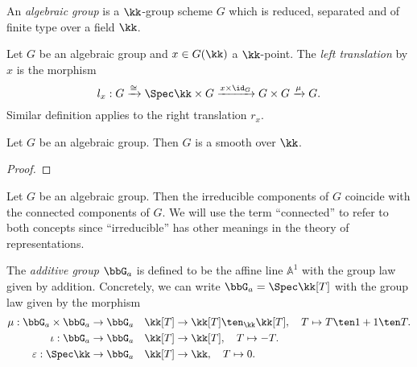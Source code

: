     \begin{definition}\label{def:algebraic_group}
        An \emph{algebraic group} is a \(\kk\)-group scheme \(G\) which is reduced, separated and of finite type over a field \(\kk\).
    \end{definition}

    \begin{definition}\label{def:transition_morphism}
        Let \(G\) be an algebraic group and \(x \in G(\kk)\) a \(\kk\)-point.
        The \emph{left translation} by \(x\) is the morphism
        \[
            l_x: G \xrightarrow{\cong} \Spec \kk \times G \xrightarrow{x \times \id_G} G \times G \xrightarrow{\mu} G.
        \]
        Similar definition applies to the right translation \(r_x\).
    \end{definition}

    \begin{proposition}\label{prop:algebraic_group_is_smooth}
        Let \(G\) be an algebraic group.
        Then \(G\) is a smooth over \(\kk\).
    \end{proposition}
    \begin{proof}
    \end{proof}

    \begin{remark}\label{rmk:irreducible_and_connected_components_of_algebraic_group}
        Let \(G\) be an algebraic group.
        Then the irreducible components of \(G\) coincide with the connected components of \(G\).
        We will use the term ``connected'' to refer to both concepts since ``irreducible'' has other meanings in the theory of representations.
    \end{remark}

    \begin{example}\label{eg:additive_group}
        The \emph{additive group} $\bbG_a$ is defined to be the affine line $\mathbb{A}^1$ with the group law given by addition.
        Concretely, we can write $\bbG_a = \Spec \kk[T]$ with the group law given by the morphism
        \begin{align*}
            \mu:\bbG_a \times \bbG_a \to \bbG_a \quad & \kk[T] \to \kk[T]\ten_\kk \kk[T], \quad T \mapsto T\ten 1 + 1 \ten T. \\
            \iota:\bbG_a \to \bbG_a \quad & \kk[T] \to \kk[T], \quad T \mapsto -T. \\
            \varepsilon:\Spec \kk \to \bbG_a \quad & \kk[T] \to \kk, \quad T \mapsto 0.
        \end{align*}
    \end{example}

